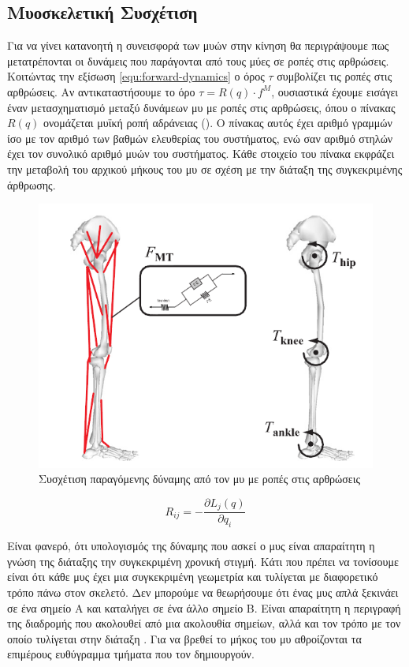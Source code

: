 \subsection{Μυοσκελετική Συσχέτιση}

Για να γίνει κατανοητή η συνεισφορά των μυών στην κίνηση θα περιγράψουμε πως μετατρέπονται οι δυνάμεις που παράγονται από τους μύες σε ροπές στις αρθρώσεις. Κοιτώντας την εξίσωση \ref{equ:forward-dynamics} ο όρος $\tau$ συμβολίζει τις ροπές στις αρθρώσεις. Αν αντικαταστήσουμε το όρο $\tau = R(q) \cdot f^{M}$, ουσιαστικά έχουμε εισάγει έναν μετασχηματισμό μεταξύ δυνάμεων μυ με ροπές στις αρθρώσεις, όπου ο πίνακας $R(q)$ ονομάζεται μυϊκή ροπή αδράνειας (). Ο πίνακας αυτός έχει αριθμό γραμμών ίσο με τον αριθμό των βαθμών ελευθερίας του συστήματος, ενώ σαν αριθμό στηλών έχει τον συνολικό αριθμό μυών του συστήματος. Κάθε στοιχείο του πίνακα εκφράζει την μεταβολή του αρχικού μήκους του μυ σε σχέση με την διάταξη της συγκεκριμένης άρθρωσης.

\begin{figure}[H]
    \centering
    \includegraphics[width=.6\textwidth, height=.30\textheight, keepaspectratio]{fig/muscle-skeleton-torque.png}
    \caption{Συσχέτιση παραγόμενης δύναμης από τον μυ με ροπές στις αρθρώσεις \cite{erdemir07}}
    \label{fig:force-torques}
\end{figure}

\begin{equation}
    R_{ij} = - \frac{\partial L_{j}(q)}{\partial q_{i}}
    \label{equ:muscle-moment-arm}
\end{equation}

Είναι φανερό, ότι υπολογισμός της δύναμης που ασκεί ο μυς είναι απαραίτητη η γνώση της διάταξης την συγκεκριμένη χρονική στιγμή. Κάτι που πρέπει να τονίσουμε είναι ότι κάθε μυς έχει μια συγκεκριμένη γεωμετρία και τυλίγεται με διαφορετικό τρόπο πάνω στον σκελετό. Δεν μπορούμε να θεωρήσουμε ότι ένας μυς απλά ξεκινάει σε ένα σημείο Α και καταλήγει σε ένα άλλο σημείο Β. Είναι απαραίτητη η περιγραφή της διαδρομής που ακολουθεί από μια ακολουθία σημείων, αλλά και τον τρόπο με τον οποίο τυλίγεται στην διάταξη \cite{delp95}. Για να βρεθεί το μήκος του μυ αθροίζονται τα επιμέρους ευθύγραμμα τμήματα που τον δημιουργούν.

